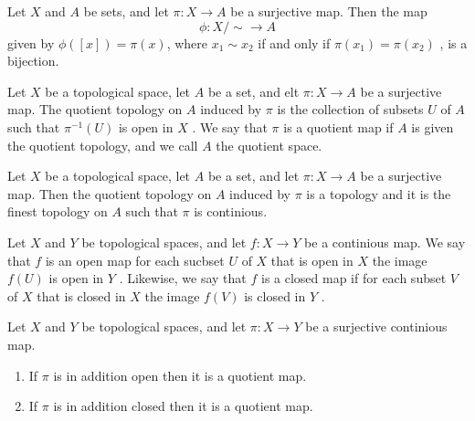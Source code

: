 \documentclass{article}
\theoremstyle{remark}
\begin{document}
\begin{lemma}
    Let $X$  and $A$ be sets, and let $\pi : X \to A $ be a surjective map. Then the map \[
    \phi : X / \sim \to A
    \]
    given by $\phi \left( \left[ x \right] \right) = \pi \left( x \right)$, where $x_{1} \sim x_{2}$ if and only if $\pi
    \left( x_{1} \right) = \pi \left( x_{2} \right)$ , is a bijection.
\end{lemma}


\begin{definition}
    Let $X$ be a topological space, let $A$  be a set, and elt $\pi : X \to A $ be a surjective map. The quotient
    topology on $A$  induced by $\pi $  is the collection of subsets $U$  of $A$  such that $\pi ^{-1} \left( U \right)$
    is open in $X$ . We say that $\pi $  is a quotient map if $A$ is given the quotient topology, and we call $A$ the
    quotient space.

\end{definition}

\begin{lemma}
    Let $X$  be a topological space, let $A$ be a set, and let $\pi : X \to A$ be a surjective map. Then the quotient
    topology on $A$ induced by $\pi $ is a topology and it is the finest topology on $A$  such that $\pi  $ is
    continious.
\end{lemma}


\begin{definition}
    Let $X$ and $Y$  be topological spaces, and let $f: X\to Y$  be a continious map. We say that $f$  is an open map
    for each sucbset $U$  of $X$ that is open in $X$  the image $f\left( U \right)$  is open in $Y$ . Likewise, we say
    that $f$  is a closed map if for each subset $V$ of $X$ that is closed in $X$ the image $f\left( V \right)$ is
    closed in $Y$ .

\end{definition}

\begin{lemma}
    Let $X$ and $Y$  be topological spaces, and let $\pi: X  \to Y  $ be a surjective continious map.
    \begin{enumerate}[label=(\roman*)]
        \item If $\pi $  is in addition open then it is a quotient map.
        \item If $\pi $  is in addition closed then it is a quotient map.
    \end{enumerate}
\end{lemma}
\end{document}
